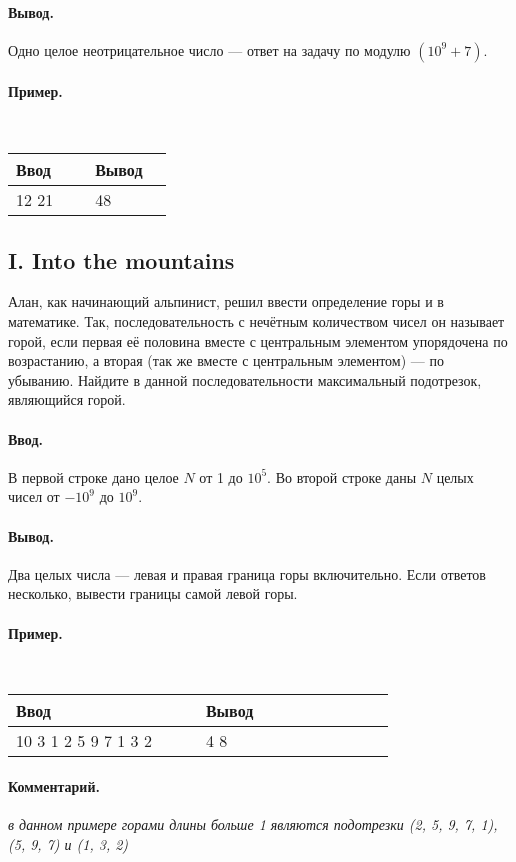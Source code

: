 \documentclass[12pt, a4paper]{article}
\newcommand{\informat}[1]
{
	\paragraph{Ввод.\\} #1
}
\newcommand{\outformat}[1]
{
	\paragraph{Вывод.\\} #1
}
\newcommand{\example}[2]
{
	\paragraph{Пример.\\}
	{\tt
	\begin{tabular}{|p{0.4\linewidth}|p{0.4\linewidth}|}
	\hline
	Ввод & Вывод \\
	\hline
	#1 & #2		\\
	\hline
	\end{tabular}
	}
}
\newcommand{\excomm}[1]
{
	\paragraph{Комментарий. \\}
	\textit{#1}
}
\begin{document}
\outformat{Одно целое неотрицательное число --- ответ на задачу по модулю $(10^9 + 7)$.}

\example{12 21}{48}

\newpage

\subsection*{I. Into the mountains}

Алан, как начинающий альпинист, решил ввести определение горы и в математике. Так, последовательность с нечётным количеством чисел он называет горой, если первая её половина вместе с центральным элементом упорядочена по возрастанию, а вторая (так же вместе с центральным элементом) --- по убыванию. Найдите в данной последовательности максимальный подотрезок, являющийся горой.

\informat{В первой строке дано целое $N$ от 1 до $10^5$. Во второй строке даны $N$ целых чисел от $-10^9$ до $10^9$.}

\outformat{Два целых числа --- левая и правая граница горы включительно. Если ответов несколько, вывести границы самой левой горы.}

\example{10\newline
5 3 1 2 5 9 7 1 3 2}{4 8}

\excomm{в данном примере горами длины больше 1 являются подотрезки (2, 5, 9, 7, 1), (5, 9, 7) и (1, 3, 2)}
\end{document}
